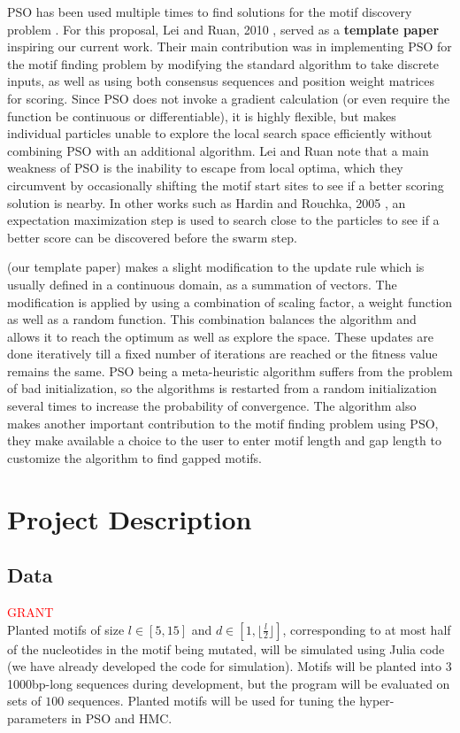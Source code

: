 \documentclass{article}
\begin{document}
PSO has been used multiple times to find solutions for the motif discovery problem \cite{hardin2005dna,lei2010particle,reddy2010planted,ge2019discovery}. For this proposal, Lei and Ruan, 2010 \cite{lei2010particle}, served as a \textbf{template paper} inspiring our current work. Their main contribution was in implementing PSO for the motif finding problem by modifying the standard algorithm to take discrete inputs, as well as using both consensus sequences and position weight matrices for scoring. Since PSO does not invoke a gradient calculation (or even require the function be continuous or differentiable), it is highly flexible, but makes individual particles unable to explore the local search space efficiently without combining PSO with an additional algorithm. Lei and Ruan note that a main weakness of PSO is the inability to escape from local optima, which they circumvent by occasionally shifting the motif start sites to see if a better scoring solution is nearby. In other works such as Hardin and Rouchka, 2005 \cite{hardin2005dna}, an expectation maximization step is used to search close to the particles to see if a better score can be discovered before the swarm step.

\cite{lei2010particle}(our template paper) makes a slight modification to the update rule which is usually defined in a continuous domain, as a summation of vectors. The modification is applied by using a combination of scaling factor, a weight function as well as a random function. This combination balances the algorithm and allows it to reach the optimum as well as explore the space. These updates are done iteratively till a fixed number of iterations are reached or the fitness value remains the same. PSO being a meta-heuristic algorithm suffers from the problem of bad initialization, so the algorithms is restarted from a random initialization several times to increase the probability of convergence.
The algorithm also makes another important contribution to the motif finding problem using PSO, they make available a choice to the user to enter motif length and gap length to customize the algorithm to find gapped motifs. 
\section{Project Description}
\subsection{Data}
\textcolor{red}{GRANT} \\
Planted motifs of size $l \in [5, 15]$ and $d \in [1, \lfloor \frac{l}{2} \rfloor]$, corresponding to at most half of the nucleotides in the motif being mutated, will be simulated using Julia code (we have already developed the code for simulation). Motifs will be planted into $3$ 1000bp-long sequences during development, but the program will be evaluated on sets of $100$ sequences. Planted motifs will be used for tuning the hyper-parameters in PSO and HMC.  
  
\end{document}
